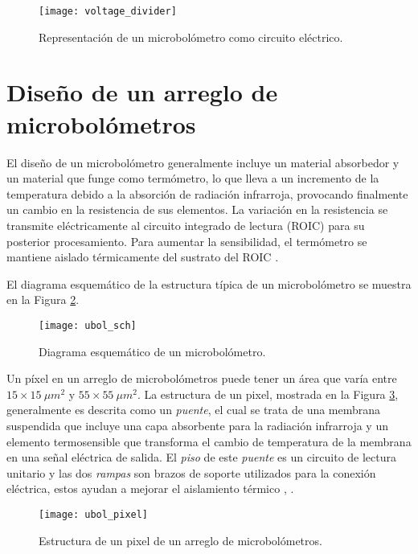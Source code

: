             \begin{figure}[hbtp]
                \centering
                \texttt{[image: voltage\_divider]}
                \caption{Representación de un microbolómetro como circuito eléctrico.}
                \label{fig:voltage_divider}
            \end{figure} 

\section{Diseño de un arreglo de microbolómetros}
El diseño de un microbolómetro generalmente incluye un material absorbedor y un material que funge como termómetro, lo que lleva a un incremento de la temperatura debido a la absorción de radiación infrarroja, provocando finalmente un cambio en la resistencia de sus elementos. La variación en la resistencia se transmite eléctricamente al circuito integrado de lectura (ROIC) para su posterior procesamiento. Para aumentar la sensibilidad, el termómetro se mantiene aislado térmicamente del sustrato del ROIC \cite{Bhan2009}.

El diagrama esquemático de la estructura típica de un microbolómetro se muestra en la Figura \ref{fig:ubol_sch}.
            \begin{figure}[hbtp]
                \centering
                \texttt{[image: ubol\_sch]}
                \caption{Diagrama esquemático de un microbolómetro.}
                \label{fig:ubol_sch}
            \end{figure}
\newpage
Un píxel en un arreglo de microbolómetros puede tener un área que varía entre $15\times 15\ \mu m^{2}$ y $55\times 55\ \mu m^{2}$. La estructura de un pixel, mostrada en la Figura \ref{fig:ubol_pixel}, generalmente es descrita como un \textit{puente}, el cual se trata de una membrana suspendida que incluye una capa absorbente para la radiación infrarroja y un elemento termosensible que transforma el cambio de temperatura de la membrana en una señal eléctrica de salida. El \textit{piso} de este \textit{puente} es un circuito de lectura unitario y las dos \textit{rampas} son brazos de soporte utilizados para la conexión eléctrica, estos ayudan a mejorar el aislamiento térmico \cite{Vincent}, \cite{Budzier}.

            \begin{figure}[hbtp]
                \centering
                \texttt{[image: ubol\_pixel]}
                \caption{Estructura de un pixel de un arreglo de microbolómetros.}
                \label{fig:ubol_pixel}
            \end{figure}

